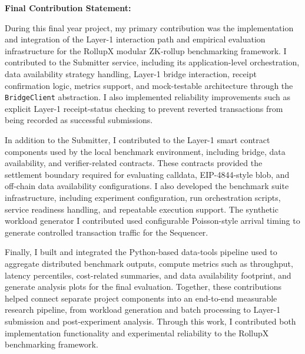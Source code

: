 \vspace{1cm}
\noindent\textbf{Final Contribution Statement:}

During this final year project, my primary contribution was the implementation and integration of the Layer-1 interaction path and empirical evaluation infrastructure for the RollupX modular ZK-rollup benchmarking framework. I contributed to the Submitter service, including its application-level orchestration, data availability strategy handling, Layer-1 bridge interaction, receipt confirmation logic, metrics support, and mock-testable architecture through the \texttt{BridgeClient} abstraction. I also implemented reliability improvements such as explicit Layer-1 receipt-status checking to prevent reverted transactions from being recorded as successful submissions.

In addition to the Submitter, I contributed to the Layer-1 smart contract components used by the local benchmark environment, including bridge, data availability, and verifier-related contracts. These contracts provided the settlement boundary required for evaluating calldata, EIP-4844-style blob, and off-chain data availability configurations. I also developed the benchmark suite infrastructure, including experiment configuration, run orchestration scripts, service readiness handling, and repeatable execution support. The synthetic workload generator I contributed used configurable Poisson-style arrival timing to generate controlled transaction traffic for the Sequencer.

Finally, I built and integrated the Python-based data-tools pipeline used to aggregate distributed benchmark outputs, compute metrics such as throughput, latency percentiles, cost-related summaries, and data availability footprint, and generate analysis plots for the final evaluation. Together, these contributions helped connect separate project components into an end-to-end measurable research pipeline, from workload generation and batch processing to Layer-1 submission and post-experiment analysis. Through this work, I contributed both implementation functionality and experimental reliability to the RollupX benchmarking framework.

